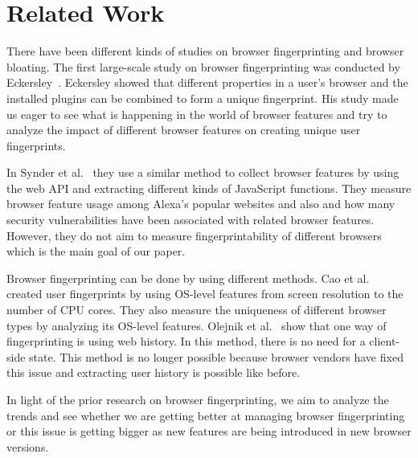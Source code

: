 \section{Related Work}
\label{sec:related-work}

There have been different kinds of studies on browser fingerprinting and browser bloating. The first large-scale study on browser fingerprinting was conducted by Eckersley~\cite{Eckersley}. Eckersley showed that different properties in a user's browser and the installed plugins can be combined to form a unique fingerprint. His study made us eager to see what is happening in the world of browser features and try to analyze the impact of different browser features on creating unique user fingerprints.

In Synder et al.~\cite{Synder} they use a similar method to collect browser features by using the web API and extracting different kinds of JavaScript functions. They measure browser feature usage among Alexa's popular websites and also and how many security vulnerabilities have been associated with related browser features. However, they do not aim to measure fingerprintability of different browsers which is the main goal of our paper.
 
Browser fingerprinting can be done by using different methods. Cao et al.~\cite{Cao} created user fingerprints by using OS-level features from screen resolution to the number of CPU cores. They also measure the uniqueness of different browser types by analyzing its OS-level features. Olejnik et al.~\cite{Olejnik} show that one way of fingerprinting is using web history. In this method, there is no need for a client-side state. This method is no longer possible because browser vendors have fixed this issue and extracting user history is possible like before.

In light of the prior research on browser fingerprinting, we aim to analyze the trends and see whether we are getting better at managing browser fingerprinting or this issue is getting bigger as new features are being introduced in new browser versions.


